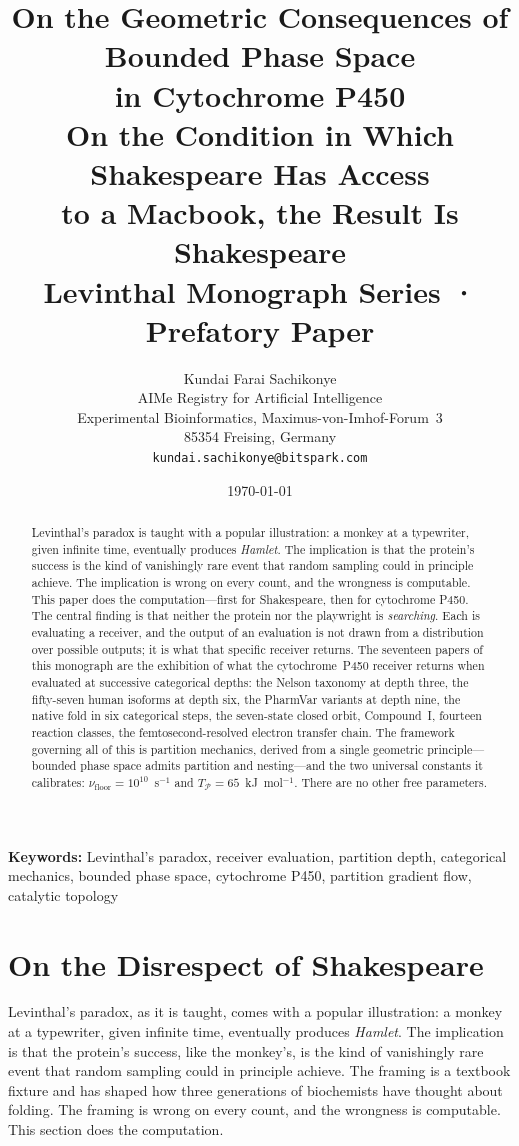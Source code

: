 \documentclass[11pt,twocolumn,a4paper]{article}
\title{
  \textbf{On the Geometric Consequences of Bounded Phase Space\\
  in Cytochrome P450}\\[0.8em]
  {\large\normalfont On the Condition in Which Shakespeare Has Access\\
  to a Macbook, the Result Is Shakespeare}\\[0.5em]
  {\small\normalfont Levinthal Monograph Series · Prefatory Paper}
}
\author{
Kundai Farai Sachikonye\\[0.3em]
AIMe Registry for Artificial Intelligence\\
Experimental Bioinformatics, Maximus-von-Imhof-Forum~3\\
85354 Freising, Germany\\
\texttt{kundai.sachikonye@bitspark.com}
}
\date{\today}
\theoremstyle{definition}
\theoremstyle{remark}
\newcommand{\Part}{\mathcal{P}}
\newcommand{\nufloor}{\nu_{\mathrm{floor}}}
\newcommand{\Tpart}{T_{\Part}}
\begin{document}
\maketitle

\begin{abstract}
\noindent
Levinthal's paradox is taught with a popular illustration: a monkey at a
typewriter, given infinite time, eventually produces \textit{Hamlet}.  The
implication is that the protein's success is the kind of vanishingly rare
event that random sampling could in principle achieve.  The implication is
wrong on every count, and the wrongness is computable.  This paper does the
computation---first for Shakespeare, then for cytochrome P450.  The central
finding is that neither the protein nor the playwright is \emph{searching}.
Each is evaluating a receiver, and the output of an evaluation is not drawn
from a distribution over possible outputs; it is what that specific receiver
returns.  The seventeen papers of this monograph are the exhibition of what
the cytochrome~P450 receiver returns when evaluated at successive categorical
depths: the Nelson taxonomy at depth three, the fifty-seven human isoforms at
depth six, the PharmVar variants at depth nine, the native fold in six
categorical steps, the seven-state closed orbit, Compound~I, fourteen reaction
classes, the femtosecond-resolved electron transfer chain.  The framework
governing all of this is partition mechanics, derived from a single geometric
principle---bounded phase space admits partition and nesting---and the two
universal constants it calibrates: $\nufloor = 10^{10}$~s$^{-1}$ and
$\Tpart = 65$~kJ~mol$^{-1}$.  There are no other free parameters.
\end{abstract}

\noindent\textbf{Keywords:} Levinthal's paradox, receiver evaluation,
partition depth, categorical mechanics, bounded phase space, cytochrome P450,
partition gradient flow, catalytic topology

\section{On the Disrespect of Shakespeare}
\label{sec:shakespeare}

Levinthal's paradox, as it is taught, comes with a popular illustration: a
monkey at a typewriter, given infinite time, eventually produces
\textit{Hamlet}.  The implication is that the protein's success, like the
monkey's, is the kind of vanishingly rare event that random sampling could in
principle achieve.  The framing is a textbook fixture and has shaped how three
generations of biochemists have thought about folding.  The framing is wrong
on every count, and the wrongness is computable.  This section does the
computation.
\end{document}
